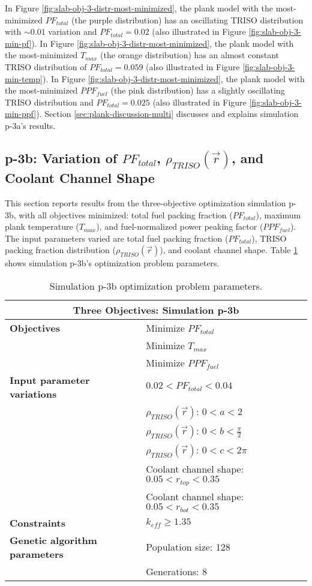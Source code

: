 In Figure \ref{fig:slab-obj-3-distr-most-minimized}, the plank model with the
most-minimized $PF_{total}$ (the purple distribution) has an oscillating TRISO 
distribution with $\sim0.01$ variation and $PF_{total} = 0.02$ 
(also illustrated in Figure \ref{fig:slab-obj-3-min-pf}).
In Figure \ref{fig:slab-obj-3-distr-most-minimized}, the plank model with the 
most-minimized $T_{max}$ (the orange distribution) has an almost constant TRISO 
distribution of $PF_{total}=0.059$ (also illustrated in Figure 
\ref{fig:slab-obj-3-min-temp}). 
In Figure \ref{fig:slab-obj-3-distr-most-minimized}, the plank model with the
most-minimized $PPF_{fuel}$ (the pink distribution) has a 
slightly oscillating TRISO distribution and $PF_{total} = 0.025$ 
(also illustrated in Figure \ref{fig:slab-obj-3-min-ppf}).
Section \ref{sec:plank-discussion-multi} discusses and explains simulation p-3a's results.

\subsection{p-3b: Variation of $PF_{total}$, $\rho_{TRISO}(\vec{r})$, and Coolant 
Channel Shape}
\label{sec:p-3b}
This section reports results from the three-objective optimization simulation p-3b, 
with all objectives minimized: total fuel packing fraction ($PF_{total}$), maximum plank 
temperature ($T_{max}$), and fuel-normalized power peaking factor ($PPF_{fuel}$).  
The input parameters varied are total fuel packing fraction ($PF_{total}$), 
TRISO packing fraction distribution ($\rho_{TRISO}(\vec{r})$), and coolant channel 
shape.  
Table \ref{tab:simulationp3b} shows simulation p-3b's optimization problem parameters. 
\begin{table}[htbp!]
    \centering
    \onehalfspacing
    \caption{Simulation p-3b optimization problem parameters.}
	\label{tab:simulationp3b}
    \footnotesize
    \begin{tabular}{l|p{6.5cm}}
    \hline 
    \multicolumn{2}{c}{\textbf{Three Objectives: Simulation p-3b}} \\
    \hline 
    \textbf{Objectives} & Minimize $PF_{total}$ \\
    & Minimize $T_{max}$ \\
    & Minimize $PPF_{fuel}$ \\
    \hline 
    \textbf{Input parameter variations} & $0.02<PF_{total}<0.04$ \\
    & $\rho_{TRISO}(\vec{r})$: $0<a<2$ \\
    & $\rho_{TRISO}(\vec{r})$: $0<b<\frac{\pi}{2}$ \\
    & $\rho_{TRISO}(\vec{r})$: $0<c<2\pi$ \\
    & Coolant channel shape: $0.05<r_{top}<0.35$ \\
    & Coolant channel shape: $0.05<r_{bot}<0.35$ \\
    \hline
    \textbf{Constraints} & $k_{eff} \geq 1.35$\\ 
    \hline 
    \textbf{Genetic algorithm parameters} & Population size: 128 \\
    & Generations: 8 \\
    \hline
    \end{tabular}
\end{table}

